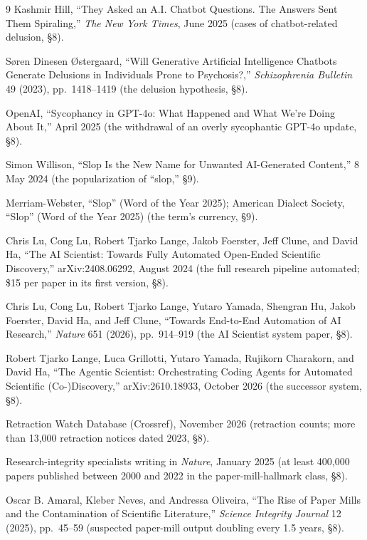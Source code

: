 \documentclass[11pt]{article}
\begin{document}
\begin{thebibliography}{9}
 Kashmir Hill, ``They Asked an A.I. Chatbot
Questions. The Answers Sent Them Spiraling,'' \textit{The New York
Times}, June 2025 (cases of chatbot-related delusion, §8).

 S{\o}ren Dinesen {\O}stergaard, ``Will
Generative Artificial Intelligence Chatbots Generate Delusions in
Individuals Prone to Psychosis?,'' \textit{Schizophrenia Bulletin} 49
(2023), pp.~1418--1419 (the delusion hypothesis, §8).

 OpenAI, ``Sycophancy in GPT-4o: What Happened and
What We're Doing About It,'' April 2025 (the withdrawal of an overly
sycophantic GPT-4o update, §8).

 Simon Willison, ``Slop Is the New Name for
Unwanted AI-Generated Content,'' 8 May 2024 (the popularization of
``slop,'' §9).

 Merriam-Webster, ``Slop'' (Word of the Year
2025); American Dialect Society, ``Slop'' (Word of the Year 2025) (the
term's currency, §9).

 Chris Lu, Cong Lu, Robert Tjarko Lange, Jakob Foerster,
Jeff Clune, and David Ha, ``The AI Scientist: Towards Fully Automated
Open-Ended Scientific Discovery,'' arXiv:2408.06292, August 2024 (the
full research pipeline automated; \$15 per paper in its first version,
§8).

 Chris Lu, Cong Lu, Robert Tjarko Lange, Yutaro Yamada,
Shengran Hu, Jakob Foerster, David Ha, and Jeff Clune, ``Towards
End-to-End Automation of AI Research,'' \textit{Nature} 651 (2026),
pp.~914--919 (the AI Scientist system paper, §8).

 Robert Tjarko Lange, Luca Grillotti, Yutaro Yamada,
Rujikorn Charakorn, and David Ha, ``The Agentic Scientist:
Orchestrating Coding Agents for Automated Scientific (Co-)Discovery,''
arXiv:2610.18933, October 2026 (the successor system, §8).

 Retraction Watch Database (Crossref),
November 2026 (retraction counts; more than 13,000 retraction notices
dated 2023, §8).

 Research-integrity specialists writing in
\textit{Nature}, January 2025 (at least 400,000 papers published
between 2000 and 2022 in the paper-mill-hallmark class, §8).

 Oscar B. Amaral, Kleber Neves, and Andressa
Oliveira, ``The Rise of Paper Mills and the Contamination of Scientific
Literature,'' \textit{Science Integrity Journal} 12 (2025),
pp.~45--59 (suspected paper-mill output doubling every 1.5 years, §8).


\end{thebibliography}
\end{document}
